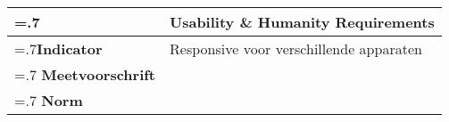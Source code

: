\noindent
\begin{longtable}{|>{\raggedleft\hsize=.7\hsize\bfseries}X|
    >{\arraybackslash\hsize=1.3\hsize}X|} \hline
\multicolumn{1}{|l|}{\textbf{NFR}} & Usability \& Humanity Requirements\\ \hline
Indicator & Responsive voor verschillende apparaten 
 \\  \hline
Meetvoorschrift & \\ \hline
Norm & \\ \hline
\end{longtable}